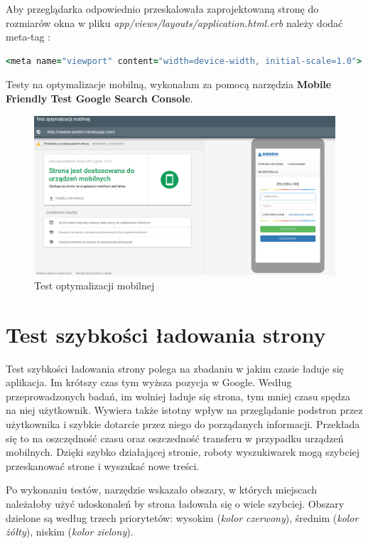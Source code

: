 \documentclass[openright]{xmgr}
\begin{document}
	\newpage
	Aby przeglądarka odpowiednio przeskalowała zaprojektowaną stronę do rozmiarów okna w pliku \textit{app/views/layouts/application.html.erb} należy dodać meta-tag \cite{framework}:
	
	\begin{lstlisting}[language=Ruby,lineskip={-1pt},caption=Meta tag odpowiedzialny za skalowanie]
<meta name="viewport" content="width=device-width, initial-scale=1.0">
	\end{lstlisting}
	
	Testy na optymalizacje mobilną, wykonałam za pomocą narzędzia \textbf{Mobile Friendly Test Google Search Console}.
	
	\begin{figure}[!tbh]
		\centering
		\includegraphics[width=\linewidth]{image/testm}
		\caption{Test optymalizacji mobilnej}
	\end{figure}
	
	\chapter{Test szybkości ładowania strony}
	Test szybkości ładowania strony polega na zbadaniu w jakim czasie ładuje się aplikacja. Im krótszy czas tym wyższa pozycja w Google. Według przeprowadzonych badań, im wolniej ładuje się strona, tym mniej czasu spędza na niej użytkownik. Wywiera także istotny wpływ na przeglądanie podstron przez użytkownika i szybkie dotarcie przez niego do porządanych informacji. Przekłada się to na oszczędność czasu oraz oszczedność transferu w przypadku urządzeń mobilnych. Dzięki szybko działającej stronie, roboty wyszukiwarek mogą szybciej przeskanować strone i wyszukać nowe treści.
	
	Po wykonaniu testów, narzędzie wskazało obszary, w których miejscach należałoby użyć udoskonaleń by strona ładowała się o wiele szybciej. Obszary dzielone są według trzech priorytetów: wysokim (\textit{kolor czerwony}), średnim (\textit{kolor żółty}), niskim (\textit{kolor zielony}).
	
\end{document}
